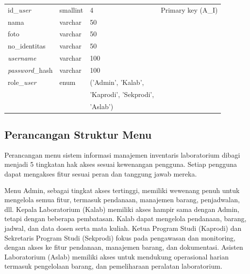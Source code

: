 \begin{enumerate}
{\begin{longtable}{l l l l}
				      id\_\textit{user}       & smallint               & 4                        & Primary key (A\_I)    \\
				      nama                    & varchar                & 50                       &                       \\
				      foto                    & varchar                & 50                       &                       \\
				      no\_identitas           & varchar                & 50                       &                       \\
				      \textit{username}       & varchar                & 100                      &                       \\
				      \textit{password}\_hash & varchar                & 100                      &                       \\
				      role\_\textit{user}     & enum                   & ('Admin', 'Kalab',       &                       \\
				                              &                        & 'Kaprodi', 'Sekprodi',   &                       \\
				                              &                        & 'Aslab')                 &                       \\
				      \hline
			      \end{longtable}
		      }

\end{enumerate}

\subsection{Perancangan Struktur Menu}
Perancangan menu sistem informasi manajemen inventaris laboratorium dibagi menjadi 5 tingkatan hak akses sesuai kewenangan pengguna. Setiap pengguna dapat mengakses fitur sesuai peran dan tanggung jawab mereka.

Menu Admin, sebagai tingkat akses tertinggi, memiliki wewenang penuh untuk mengelola semua fitur, termasuk pendanaan, manajemen barang, penjadwalan, dll. Kepala Laboratorium (Kalab) memiliki akses hampir sama dengan Admin, tetapi dengan beberapa pembatasan. Kalab dapat mengelola pendanaan, barang, jadwal, dan data dosen serta mata kuliah. Ketua Program Studi (Kaprodi) dan Sekretaris Program Studi (Sekprodi) fokus pada pengawasan dan monitoring, dengan akses ke fitur pendanaan, manajemen barang, dan dokumentasi. Asisten Laboratorium (Aslab) memiliki akses untuk mendukung operasional harian termasuk pengelolaan barang, dan pemeliharaan peralatan laboratorium.

